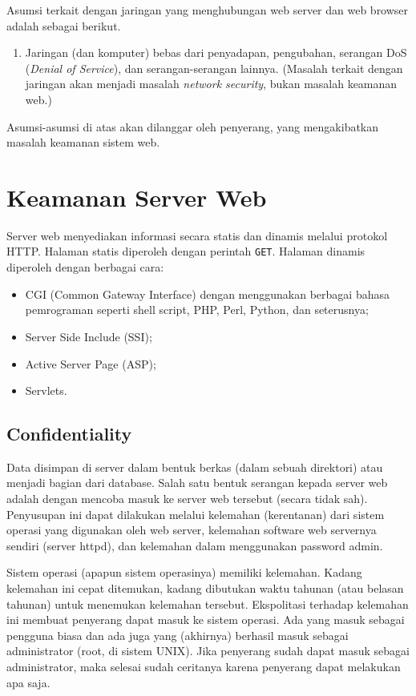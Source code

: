 Asumsi terkait dengan jaringan yang menghubungan web server dan web browser
adalah sebagai berikut.
\begin{enumerate}
   \item Jaringan (dan komputer) bebas dari penyadapan, pengubahan, serangan
      DoS ({\em Denial of Service}), 
      dan serangan-serangan lainnya. (Masalah terkait dengan jaringan akan menjadi
      masalah {\em network security}, bukan masalah keamanan web.)
\end{enumerate}

Asumsi-asumsi di atas akan dilanggar oleh penyerang, yang mengakibatkan masalah
keamanan sistem web.


\section{Keamanan Server Web}
Server web menyediakan informasi secara statis dan dinamis melalui protokol
HTTP. Halaman statis diperoleh dengan perintah {\tt GET}. Halaman dinamis
diperoleh dengan berbagai cara:

\begin{itemize}
   \item CGI (Common Gateway Interface) dengan menggunakan berbagai bahasa
      pemrograman seperti shell script, PHP, Perl, Python, dan seterusnya;
   \item Server Side Include (SSI);
   \item Active Server Page (ASP);
   \item Servlets.
\end{itemize}

\subsection{Confidentiality}
Data disimpan di server dalam bentuk berkas (dalam sebuah direktori) atau
menjadi bagian dari database. Salah satu bentuk serangan kepada server web
adalah dengan mencoba masuk ke server web tersebut (secara tidak sah).
Penyusupan ini dapat dilakukan melalui kelemahan (kerentanan) dari sistem
operasi yang digunakan oleh web server, kelemahan software web servernya
sendiri (server httpd), dan kelemahan dalam menggunakan password admin.

Sistem operasi (apapun sistem operasinya) memiliki kelemahan. Kadang kelemahan
ini cepat ditemukan, kadang dibutukan waktu tahunan (atau belasan tahunan)
untuk menemukan kelemahan tersebut. Ekspolitasi terhadap kelemahan ini membuat
penyerang dapat masuk ke sistem operasi. Ada yang masuk sebagai pengguna biasa
dan ada juga yang (akhirnya) berhasil masuk sebagai administrator (root, di
sistem UNIX). Jika penyerang sudah dapat masuk sebagai administrator, maka
selesai sudah ceritanya karena penyerang dapat melakukan apa saja.

